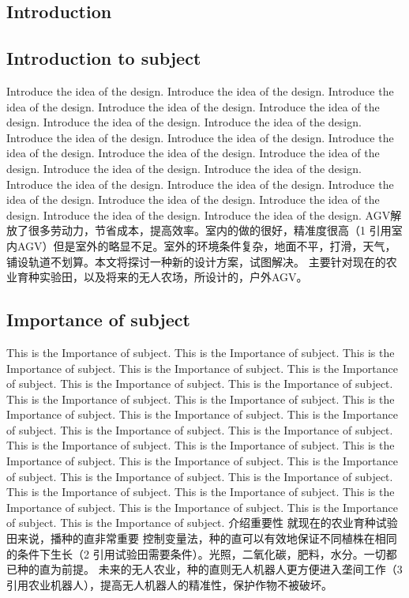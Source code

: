 \documentclass[12pt]{article}
\begin{document}
\begin{flushleft}

\section{Introduction}

\subsection{Introduction to subject}
Introduce the idea of the design. Introduce the idea of the design. Introduce the idea of the design. Introduce the idea of the design. Introduce the idea of the design. Introduce the idea of the design. Introduce the idea of the design. Introduce the idea of the design. Introduce the idea of the design. Introduce the idea of the design. Introduce the idea of the design. Introduce the idea of the design. Introduce the idea of the design. Introduce the idea of the design. Introduce the idea of the design. Introduce the idea of the design. Introduce the idea of the design. Introduce the idea of the design. Introduce the idea of the design. Introduce the idea of the design. Introduce the idea of the design.\cite{bozer1991tandem}
AGV解放了很多劳动力，节省成本，提高效率。室内的做的很好，精准度很高（1 引用室内AGV）但是室外的略显不足。室外的环境条件复杂，地面不平，打滑，天气，铺设轨道不划算。本文将探讨一种新的设计方案，试图解决。
主要针对现在的农业育种实验田，以及将来的无人农场，所设计的，户外AGV。

\subsection{Importance of subject}
This is the Importance of subject. This is the Importance of subject. This is the Importance of subject. This is the Importance of subject. This is the Importance of subject. This is the Importance of subject. This is the Importance of subject. This is the Importance of subject. This is the Importance of subject. This is the Importance of subject. This is the Importance of subject. This is the Importance of subject. This is the Importance of subject. This is the Importance of subject. This is the Importance of subject. This is the Importance of subject. This is the Importance of subject. This is the Importance of subject. This is the Importance of subject. This is the Importance of subject. This is the Importance of subject. This is the Importance of subject. This is the Importance of subject. This is the Importance of subject. This is the Importance of subject. This is the Importance of subject. This is the Importance of subject. \cite{douglas2000navigation} \cite{egbelu1984characterization}
介绍重要性
就现在的农业育种试验田来说，播种的直非常重要
控制变量法，种的直可以有效地保证不同植株在相同的条件下生长（2 引用试验田需要条件）。光照，二氧化碳，肥料，水分。一切都已种的直为前提。
未来的无人农业，种的直则无人机器人更方便进入垄间工作（3 引用农业机器人），提高无人机器人的精准性，保护作物不被破坏。


\end{flushleft}
\end{document}

